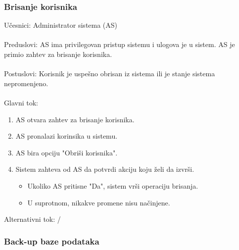 \subsubsection{Brisanje korisnika}

\noindent U\v cesnici: Administrator sistema (AS)
\\
\\ Preduslovi: AS ima privilegovan pristup sistemu i ulogova je u sistem. AS je primio zahtev za brisanje korisnika.
\\
\\ Postuslovi: Korisnik je uspe\v sno obrisan iz sistema ili je stanje sistema nepromenjeno.
\\
\\ Glavni tok:
\begin{enumerate}
	\item AS otvara zahtev za brisanje korisnika.
	\item AS pronalazi korinsika u sistemu.
	\item AS bira opciju "Obri\v si korisnika".
	\item Sistem zahteva od AS da potvrdi akciju koju \v zeli da izvr\v si.
	\begin{itemize}
		\item Ukoliko AS pritisne "Da", sistem vr\v si operaciju brisanja.
		\item U suprotnom, nikakve promene nisu na\v cinjene.
	\end{itemize}
\end{enumerate}

\noindent Alternativni tok: /

\subsubsection{Back-up baze podataka}

